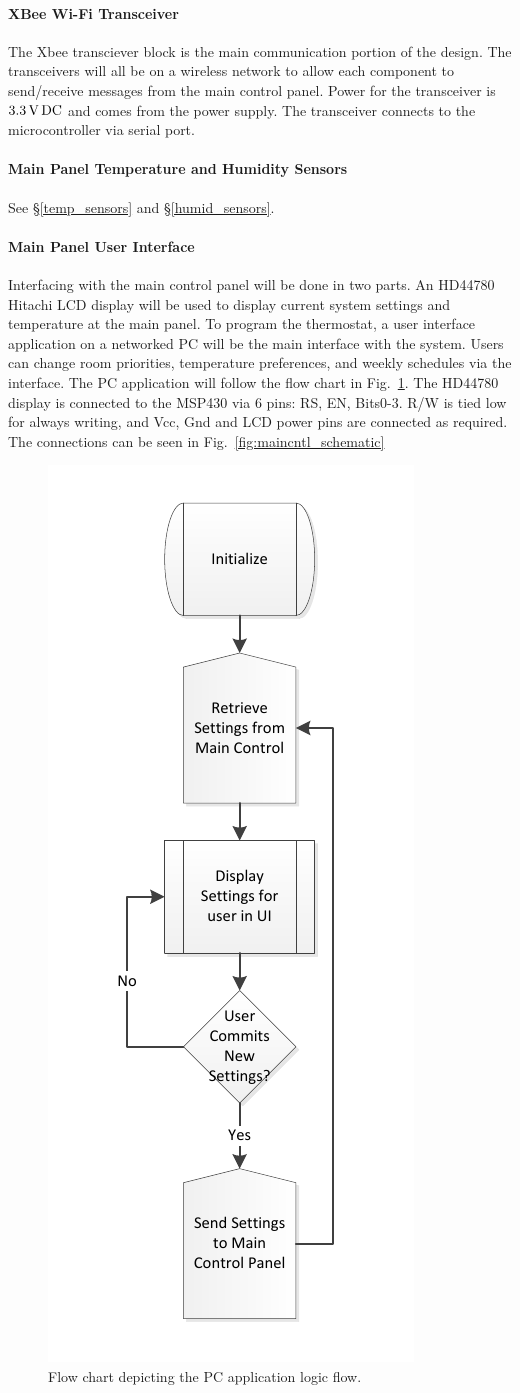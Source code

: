 \paragraph{XBee Wi-Fi Transceiver}
The Xbee transciever block is the main communication portion of the design. The transceivers will all be on a wireless network to allow each component to send/receive messages from the main control panel. Power for the transceiver is $3.3\mbox{\,V\,DC}$ and comes from the power supply. The transceiver connects to the microcontroller via serial port.

\paragraph{Main Panel Temperature and Humidity Sensors}
See \S\ref{temp_sensors} and \S\ref{humid_sensors}.

\paragraph{Main Panel User Interface}
Interfacing with the main control panel will be done in two parts. An HD44780 Hitachi LCD display will be used to display current system settings and temperature at the main panel. To program the thermostat, a user interface application on a networked PC will be the main interface with the system. Users can change room priorities, temperature preferences, and weekly schedules via the interface. The PC application will follow the flow chart in Fig.~\ref{fig:PCapp_flow}.
The HD44780 display is connected to the MSP430 via 6 pins: RS, EN, Bits0-3. R/W is tied low for always writing, and Vcc, Gnd and LCD power pins are connected as required. The connections can be seen in Fig.~\ref{fig:maincntl_schematic}
\begin{figure}
\centering
\includegraphics[width=.4\textwidth]{PCapp_flow.pdf}
\caption{Flow chart depicting the PC application logic flow.}
\label{fig:PCapp_flow}
\end{figure}



